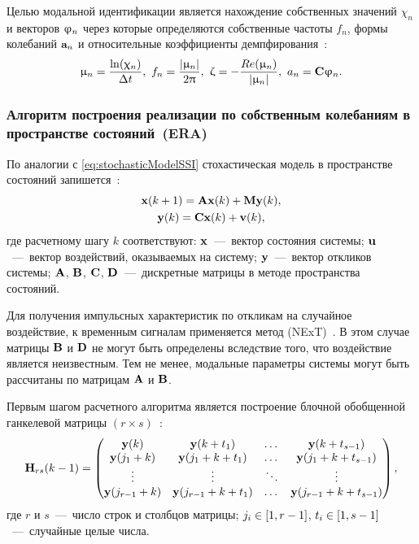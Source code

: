 Целью модальной идентификации является нахождение собственных значений $ \chi_n $ и векторов $ \mathbf{\upvarphi}_n $ через которые определяются собственные частоты $ f_n $, формы колебаний $ \mathbf{a}_n $ и относительные коэффициенты демпфирования~\cite{lib:oma:Nilsson}:
\begin{equation}
	\upmu_n = \frac{\ln(\upchi_n)}{\Delta t}, \ f_n = \frac{|\upmu_n|}{2 \uppi}, \ \upzeta = -\frac{Re(\upmu_n)}{|\upmu_n|}, \ a_n = \mathbf{C} \mathbf{\upvarphi}_n.
\end{equation}

\subsubsection{Алгоритм построения реализации по собственным колебаниям в пространстве состояний~(ERA)}

По аналогии с \eqref{eq:stochasticModelSSI} стохастическая модель в пространстве состояний запишется~\cite{lib:oma:Juang&Pappa}:
\begin{equation}
	\begin{gathered}
		\mathbf{x}(k + 1) = \mathbf{A} \mathbf{x}(k) + \mathbf{M} \mathbf{y}(k), \\
		\mathbf{y}(k) = \mathbf{C} \mathbf{x}(k) + \mathbf{v}(k),
	\end{gathered}
\end{equation}
где расчетному шагу $ k $ соответствуют: $ \mathbf{x} $~---~вектор состояния системы; $ \mathbf{u} $~---~вектор воздействий, оказываемых на систему; $ \mathbf{y} $~---~вектор откликов системы; $ \mathbf{A} $, $ \mathbf{B} $, $ \mathbf{C} $, $ \mathbf{D} $~---~дискретные матрицы в методе пространства состояний.

Для получения импульсных характеристик по откликам на случайное воздействие, к временным сигналам применяется метод  (NExT)~\cite{lib:oma:Lin}. В этом случае матрицы $ \mathbf{B} $ и $ \mathbf{D} $ не могут быть определены вследствие того, что воздействие является неизвестным. Тем не менее, модальные параметры системы могут быть рассчитаны по матрицам $ \mathbf{A} $ и $ \mathbf{B} $. 

Первым шагом расчетного алгоритма является построение блочной обобщенной ганкелевой матрицы $ (r \times s) $~\cite{lib:oma:Caicedo}:
\begin{equation}
	\mathbf{H}_{rs}(k - 1) = 
	\begin{pmatrix}
		\mathbf{y}(k) & \mathbf{y}(k + t_1) & \dots & \mathbf{y}(k + t_{s - 1}) \\
		\mathbf{y}(j_1 + k) & \mathbf{y}(j_1 + k + t_1) & \dots & \mathbf{y}(j_1 + k + t_{s - 1}) \\
		\vdots & \vdots & \ddots & \vdots \\
		\mathbf{y}(j_{r - 1} + k) & \mathbf{y}(j_{r - 1} + k + t_1) & \dots & \mathbf{y}(j_{r - 1} + k + t_{s - 1})
	\end{pmatrix}, \label{eq:matrixHankel}
\end{equation}
где $ r $ и $ s $~---~число строк и столбцов матрицы; $ j_i \in \left[ 1, r - 1 \right] $, $ t_i \in \left[ 1, s - 1 \right] $~---~случайные целые числа.

